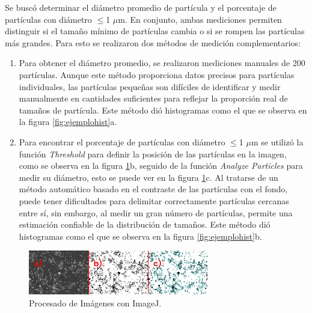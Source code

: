 \documentclass[../main.tex]{subfiles}
\begin{document}
Se buscó determinar el diámetro promedio de partícula y el porcentaje de partículas con diámetro $\leq$1 $\mu$m. En conjunto, ambas mediciones permiten distinguir si el tamaño mínimo de partículas cambia o si se rompen las partículas más grandes. Para esto se realizaron dos métodos de medición complementarios:
\begin{enumerate}
    \item Para obtener el diámetro promedio, se realizaron mediciones manuales de 200 partículas. Aunque este método proporciona datos precisos para partículas individuales, las partículas pequeñas son difíciles de identificar y medir manualmente en cantidades suficientes para reflejar la proporción real de tamaños de partícula. Este método dió histogramas como el que se observa en la figura \ref{fig:ejemplohist}a.
    \item Para encontrar el porcentaje de partículas con diámetro $\leq$1 $\mu$m se utilizó la función \textit{Threshold} para definir la posición de las partículas en la imagen, como se observa en la figura \ref{fig:imgjcomp}b, seguido de la función \textit{Analyze Particles} para medir su diámetro, esto se puede ver en la figura \ref{fig:imgjcomp}c. Al tratarse de un método automático basado en el contraste de las partículas con el fondo, puede tener dificultades para delimitar correctamente partículas cercanas entre sí, sin embargo, al medir un gran número de partículas,  permite una estimación confiable de la distribución de tamaños. Este método dió histogramas como el que se observa en la figura \ref{fig:ejemplohist}b.
\end{enumerate}
\begin{figure}[H]
    \centering
    \includegraphics[width=0.7\textwidth]{fig/imagejcomp.png}
    \caption{Procesado de Imágenes con ImageJ.}
    \label{fig:imgjcomp}
\end{figure}
\end{document}
